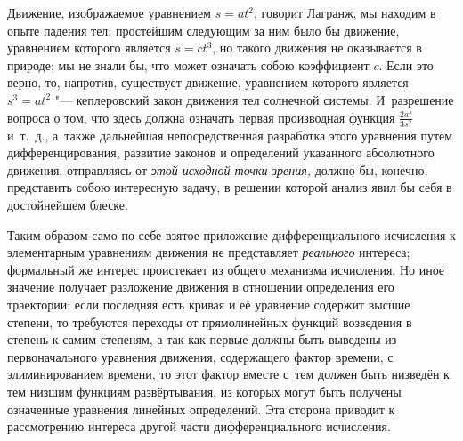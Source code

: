 Движение, изображаемое уравнением $s=at^2$, говорит Лагранж, мы находим в опыте
падения тел; простейшим следующим за ним было бы движение, уравнением которого
является $s=ct^3$, но такого движения не оказывается в природе; мы не знали бы,
что может означать собою коэффициент $c$. Если это верно, то, напротив,
существует движение, уравнением которого является $s^3=at^2$ "--- кеплеровский
закон движения тел солнечной системы. И~разрешение вопроса о том, что здесь
должна означать первая производная функция $\frac{2at}{3s^2}$ и~т.~д., а~также
дальнейшая непосредственная разработка этого уравнения путём дифференцирования,
развитие законов и определений указанного абсолютного движения, отправляясь от
{\em этой исходной точки зрения,} должно бы, конечно, представить собою
интересную задачу, в решении которой анализ явил бы себя в достойнейшем блеске.

Таким образом само по себе взятое приложение дифференциального исчисления
к элементарным уравнениям движения не представляет {\em реального} интереса;
формальный же интерес проистекает из общего механизма исчисления. Но иное
значение получает разложение движения в отношении определения его траектории;
если последняя есть кривая и её уравнение содержит высшие степени, то требуются
переходы от прямолинейных функций возведения в степень к самим степеням, а так
как первые должны быть выведены из первоначального уравнения движения,
содержащего фактор времени, с элиминированием времени, то этот фактор вместе
с~тем должен быть низведён к тем низшим функциям развёртывания, из которых
могут быть получены означенные уравнения линейных определений. Эта сторона
приводит к рассмотрению интереса другой части дифференциального исчисления.

